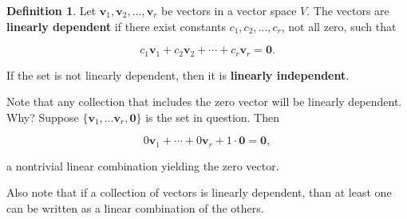 \documentclass[
]{book}
\theoremstyle{definition}
\newtheorem{definition}{Definition}[chapter]
\theoremstyle{definition}
\theoremstyle{definition}
\theoremstyle{definition}
\theoremstyle{remark}
\begin{document}
\begin{defbox}

\begin{definition}
Let \(\mathbf{v}_1,\mathbf{v}_2,\dots,\mathbf{v}_r\) be vectors in a vector space \(V\). The vectors are \textbf{linearly dependent} if there exist constants \(c_1,c_2,\dots,c_r\), not all zero, such that

\[c_1\mathbf{v}_1+c_2\mathbf{v}_2+\cdots+c_r\mathbf{v}_r=\mathbf{0}.\]

If the set is not linearly dependent, then it is \textbf{linearly independent}.
\end{definition}

\end{defbox}

Note that any collection that includes the zero vector will be linearly dependent. Why? Suppose \(\{\mathbf{v}_1,\dots \mathbf{v}_r, \mathbf{0}\}\) is the set in question. Then

\[0\mathbf{v}_1+\cdots+0\mathbf{v}_r+1\cdot \mathbf{0}=\mathbf{0},\]

a nontrivial linear combination yielding the zero vector.

Also note that if a collection of vectors is linearly dependent, than at least one can be written as a linear combination of the others.
\end{document}
